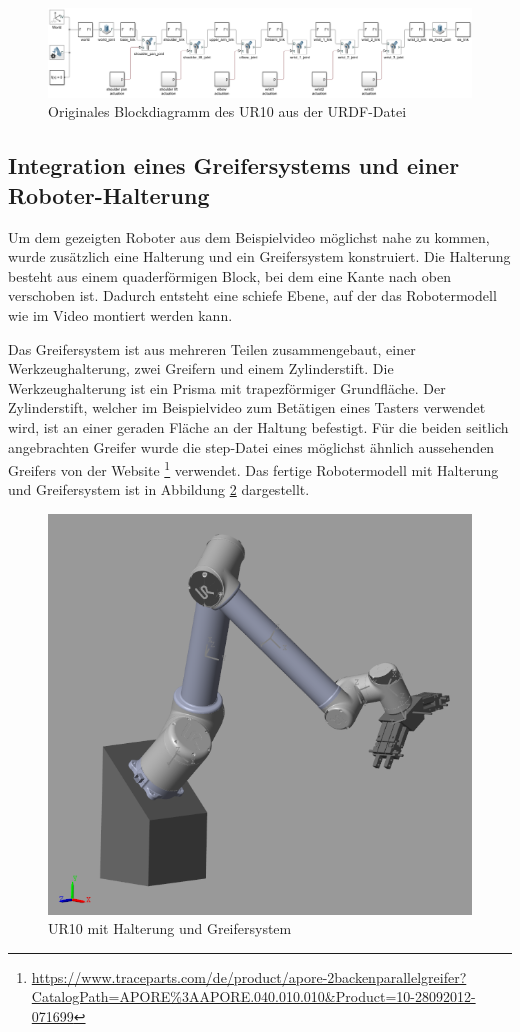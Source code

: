 \begin{figure}[!htbp]
	\centering
	\includegraphics[width=1.0\linewidth]{grafic/origin_UR10_modell}
	\caption{Originales Blockdiagramm des UR10 aus der URDF-Datei}
	\label{fig:ur10_origin_modell}
\end{figure}


\subsection{Integration eines Greifersystems und einer Roboter-Halterung}

Um dem gezeigten Roboter aus dem Beispielvideo möglichst nahe zu kommen, wurde zusätzlich eine Halterung und ein Greifersystem konstruiert.
Die Halterung besteht aus einem quaderförmigen Block, bei dem eine Kante nach oben verschoben ist. %
Dadurch entsteht eine schiefe Ebene, auf der das Robotermodell wie im Video montiert werden kann.

Das Greifersystem ist aus mehreren Teilen zusammengebaut, einer Werkzeughalterung, zwei Greifern und einem Zylinderstift.
Die Werkzeughalterung ist ein Prisma mit trapezförmiger Grundfläche.
Der Zylinderstift, welcher im Beispielvideo zum Betätigen eines Tasters verwendet wird, ist an einer geraden Fläche an der Haltung befestigt.
Für die beiden seitlich angebrachten Greifer wurde die step-Datei eines möglichst ähnlich aussehenden Greifers von der Website \footnote{\url{https://www.traceparts.com/de/product/apore-2backenparallelgreifer?CatalogPath=APORE\%3AAPORE.040.010.010&Product=10-28092012-071699}} verwendet.
Das fertige Robotermodell mit Halterung und Greifersystem ist in Abbildung \ref{fig:ur10_greifer} dargestellt.

\begin{figure}[!htbp]
	\centering
	\includegraphics[width=0.5\linewidth]{grafic/UR10_Greifer}
	\caption{UR10 mit Halterung und Greifersystem}
	\label{fig:ur10_greifer}
\end{figure}


